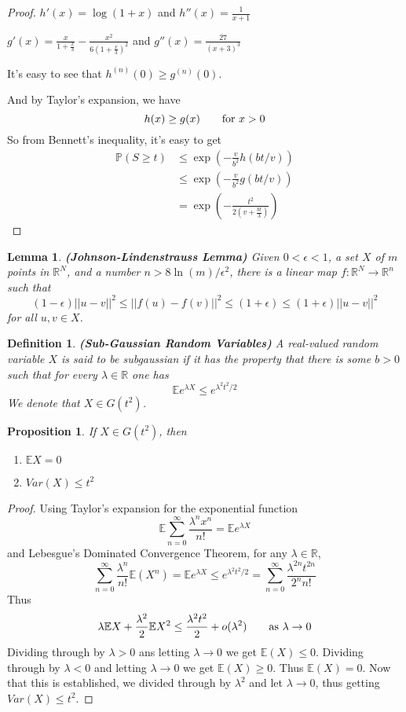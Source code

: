 \documentclass[11pt]{article}
\def\BP{{\bf P}}
\def\BR{{\mathbb R}}
\def\BE{{\mathbb E}}
\def\BP{{\mathbb P}}
\newtheorem{lemma}{Lemma}[section]
\newtheorem{definition}{Definition}[section]
\newtheorem{proposition}{Proposition}[section]
\begin{document}
\begin{proof}
$h'(x) = \log(1+x)$ and $h''(x) = \frac{1}{x+1}$

$g'(x) = \frac{x}{1 + \frac{x}{3}} - \frac{x^2}{6(1+\frac{x}{3})^2}$ and $g''(x) = \frac{27}{(x+3)^3}$

It's easy to see that $h^{(n)}(0) \geq g^{(n)}(0)$.

And by Taylor's expansion, we have
\[
h(x) \geq g(x) \text{\quad\quad for } x > 0
\]
So from Bennett's inequality, it's easy to get
\[\begin{split}
\BP(S \geq t) &\leq \exp(-\frac{v}{b^2}h(bt/v)) \\
&\leq \exp(-\frac{v}{b^2}g(bt/v)) \\
&= \exp(-\frac{t^2}{2(v+\frac{bt}{3})})
\end{split}\]
\end{proof}

\begin{lemma}\textbf{(Johnson-Lindenstrauss Lemma)}
Given $0 < \epsilon < 1$, a set $X$ of $m$ points in $\BR^N$, and a number $n > 8 \ln(m) / \epsilon^2$, there is a linear map $f: \BR^N \to \BR^n$ such that 
\[
(1 - \epsilon) ||u - v||^2 \leq ||f(u) - f(v)||^2 \leq (1 + \epsilon) \leq (1+\epsilon) ||u - v||^2
\]
for all $u, v \in X$.
\end{lemma}

\begin{definition}\textbf{(Sub-Gaussian Random Variables)}
A real-valued random variable $X$ is said to be subgaussian if it has the property that there is some $b > 0$ such that for every $\lambda \in \BR$ one has \[
\BE e^{\lambda X} \leq e^{\lambda^2 t^2/ 2}
\]
We denote that $X \in G(t^2)$.
\end{definition}

\begin{proposition}
If $X\in G(t^2)$, then 
\begin{enumerate}
\item $\BE X = 0$
\item $Var(X) \leq t^2$
\end{enumerate}
\end{proposition}
\begin{proof}
Using Taylor's expansion for the exponential function
\[
\BE \sum_{n = 0}^\infty \frac{\lambda^n x^n}{n!} = \BE e^{\lambda X}
\] and Lebesgue's Dominated Convergence Theorem, for any $\lambda \in \BR$,
\[
\sum_{n=0}^\infty \frac{\lambda^n}{n!} \BE(X^n) = \BE e^{\lambda X} \leq e^{\lambda^2 t^2 /2 } = \sum_{n = 0}^\infty \frac{\lambda^{2n}t^{2n}}{2^n n!}
\]
Thus 
\[
\lambda \BE X + \frac{\lambda^2}{2}\BE X^2 \leq \frac{\lambda^2 t^2}{2} + o(\lambda^2)
\text{\quad\quad as $\lambda \to 0$}
\]
Dividing through by $\lambda > 0$ ans letting $\lambda \to 0$ we get $\BE (X) \leq 0$. Dividing through by $\lambda < 0$ and letting $\lambda \to 0$ we get $\BE (X) \geq 0$. Thus $\BE(X) = 0$. Now that this is established, we divided through by $\lambda^2$ and let $\lambda \to 0$, thus getting $Var(X) \leq t^2$.
\end{proof}
\end{document}
